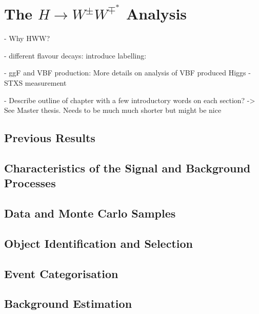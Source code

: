 \chapter{The $H\rightarrow W^{\pm}W^{\mp^*}$ Analysis}
\label{chap:hww}

- Why HWW?

- different flavour decays: introduce labelling: \HWWdet 

- ggF and VBF production: More details on analysis of VBF produced Higgs
- STXS measurement

- Describe outline of chapter with a few introductory words on each section?
    -> See Master thesis. Needs to be much much shorter but might be nice


\section{Previous Results}
\label{sec:prev-results}



\section{Characteristics of the Signal and Background Processes}
\label{sec:signal-bkg-characteristics}



\section{Data and Monte Carlo Samples}
\label{sec:data-mc-samples}



\section{Object Identification and Selection}
\label{sec:object-selection}



\section{Event Categorisation}
\label{sec:event-categorisation}



\section{Background Estimation}
\label{sec:bkg-estimation}



